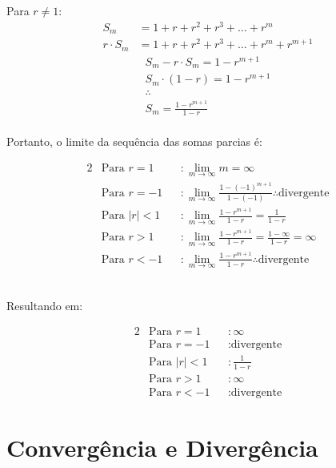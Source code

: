 \documentclass{article}
\begin{document}
Para $r \neq 1$:
\begin{align*}
  S_m &= 1 + r + r^2 + r^3 + \hdots + r^m \\
  r \cdot S_m &= 1 + r + r^2 + r^3 + \hdots + r^m + r^{m+1}
\end{align*}
\begin{gather*}
  S_m - r \cdot S_m = 1 - r^{m+1} \\
  S_m \cdot (1 - r) = 1 - r^{m+1} \\
  \therefore \\
  S_m = \frac{1 - r^{m+1}}{1 - r}
\end{gather*}
\\
Portanto, o limite da sequ\^encia das somas parcias \'e: \\[-5pt]
\begin{minipage}{.5\textwidth}
  \begin{alignat*}{2}
    &\text{Para $r = 1$}   &&: \lim_{m\to\infty} m = \infty \\[5pt]
    &\text{Para $r = -1$}  &&: \lim_{m\to\infty} \frac{1 - {(-1)}^{m+1}}{1 - (-1)} \therefore \text{divergente} \\[5pt]
    &\text{Para $|r| < 1$} &&: \lim_{m\to\infty} \frac{1 - r^{m+1}}{1 - r} = \frac{1}{1 - r} \\[5pt]
    &\text{Para $r > 1$}   &&: \lim_{m\to\infty} \frac{1 - r^{m+1}}{1 - r} = \frac{1 - \infty}{1 - r} = \infty \\[5pt]
    &\text{Para $r < -1$}  &&: \lim_{m\to\infty} \frac{1 - r^{m+1}}{1 - r} \therefore \text{divergente}
  \end{alignat*}
\end{minipage} \\[10pt]
Resultando em:\\[-5pt]
\begin{minipage}{.3\textwidth}
  \begin{alignat*}{2}
    &\text{Para $r = 1$}   &&: \infty \\
    &\text{Para $r = -1$}  &&: \text{divergente} \\
    &\text{Para $|r| < 1$} &&: \frac{1}{1 - r} \\
    &\text{Para $r > 1$}   &&: \infty \\
    &\text{Para $r < -1$}  &&: \text{divergente}
  \end{alignat*}
\end{minipage}



\newpage
\section{Converg\^encia e Diverg\^encia}
\end{document}
